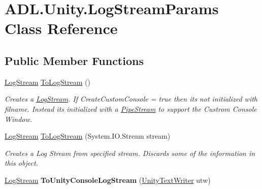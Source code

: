 \hypertarget{class_a_d_l_1_1_unity_1_1_log_stream_params}{}\section{A\+D\+L.\+Unity.\+Log\+Stream\+Params Class Reference}
\label{class_a_d_l_1_1_unity_1_1_log_stream_params}
\subsection*{Public Member Functions}
\begin{DoxyCompactItemize}
\item 
\mbox{\hyperlink{class_a_d_l_1_1_log_stream}{Log\+Stream}} \mbox{\hyperlink{class_a_d_l_1_1_unity_1_1_log_stream_params_a511976146d776a6e618baf1e47c99f34}{To\+Log\+Stream}} ()
\begin{DoxyCompactList}\small\item\em Creates a \mbox{\hyperlink{class_a_d_l_1_1_log_stream}{Log\+Stream}}. If Create\+Custom\+Console = true then its not initialized with filname. Instead its initialized with a \mbox{\hyperlink{class_a_d_l_1_1_pipe_stream}{Pipe\+Stream}} to support the Custrom Console Window. \end{DoxyCompactList}\item 
\mbox{\hyperlink{class_a_d_l_1_1_log_stream}{Log\+Stream}} \mbox{\hyperlink{class_a_d_l_1_1_unity_1_1_log_stream_params_a8cd3548465c20596918ee37292bed704}{To\+Log\+Stream}} (System.\+I\+O.\+Stream stream)
\begin{DoxyCompactList}\small\item\em Creates a Log Stream from specified stream. Discards some of the information in this object. \end{DoxyCompactList}\item 
\mbox{\label{class_a_d_l_1_1_unity_1_1_log_stream_params_a4ddd973dcdb2303a0a00487e5f97d2fd}} 
\mbox{\hyperlink{class_a_d_l_1_1_log_stream}{Log\+Stream}} {\bfseries To\+Unity\+Console\+Log\+Stream} (\mbox{\hyperlink{class_a_d_l_1_1_unity_1_1_unity_text_writer}{Unity\+Text\+Writer}} utw)
\end{DoxyCompactItemize}
